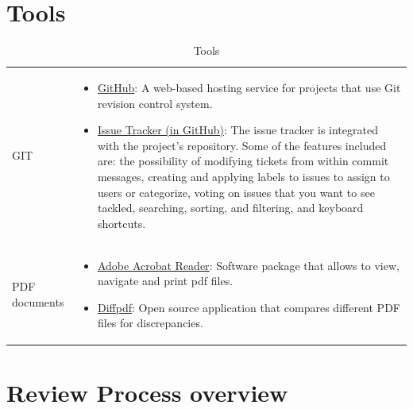 \documentclass{template/openetcs_article}
\begin{document}
\section{Tools}
\begin{table}[H]
\begin{tabular}{|m{3cm}|m{11cm}|}
\hline
\rowcolor{myblue}
\multicolumn{2}{|c|}{Tools} \\\hline
GIT &
\begin{itemize}
\item \underline{GitHub}: A web-based hosting service for projects that use Git revision control system.
\item \underline{Issue Tracker (in GitHub)}: The issue tracker is integrated with the project's repository. Some of the features included are: the possibility of modifying tickets from within commit messages,
creating and applying labels to issues to assign to users or categorize, voting on issues that you want to see tackled, searching, sorting, and filtering, and keyboard shortcuts.
\end{itemize}
\\\hline
PDF documents &
\begin{itemize}
\item \underline{Adobe Acrobat Reader}: Software package that allows to view, navigate and print pdf files.
\item \underline{Diffpdf}: Open source application that compares different PDF files for discrepancies. 
\end{itemize}
\\\hline
\end{tabular}
\caption{Tools}
\end{table}

\section{Review Process overview}
\end{document}

